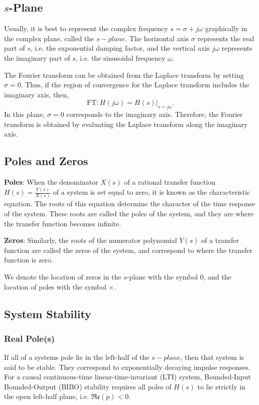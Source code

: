 \documentclass{article}
\begin{document}
\subsection{$s$-Plane}
Usually, it is best to represent the complex frequency $s=\sigma +j\omega $ graphically in the complex plane, called the $s-plane$. The horizontal axis $\sigma $ represents the real part of $s$, i.e. the exponential damping factor, and the vertical axis $j\omega $ represents the imaginary part of $s$, i.e. the sinusoidal frequency $\omega $.

The Fourier transform can be obtained from the Laplace transform by setting $\sigma =0$. Thus, if the region of convergence for the Laplace transform includes the imaginary axis, then,
\[
    \text{FT}: H(j\omega )=H(s)\rvert_{s=j\omega }.
\]In this plane, $\sigma =0$ corresponds to the imaginary axis. Therefore, the Fourier transform is obtained by evaluating the Laplace transform along the imaginary axis.

\subsection{Poles and Zeros}
\textbf{Poles}: When the denominator $X(s)$ of a rational transfer function $H(s)=\frac{Y(s)}{X(s)}$ of a system is set equal to zero, it is known as the characteristic equation. The roots of this equation determine the character of the time response of the system. These roots are called the poles of the system, and they are where the transfer function becomes infinite.

\noindent\textbf{Zeros}: Similarly, the roots of the numerator polynomial $Y(s)$ of a transfer function are called the zeros of the system, and correspond to where the transfer function is zero.

We denote the location of zeros in the $s$-plane with the symbol $0$, and the location of poles with the symbol $\times$.

\subsection{System Stability}
\subsubsection{Real Pole(s)}
If all of a systems pole lie in the left-half of the $s-plane$, then that system is said to be stable. They correspond to exponentially decaying impulse responses. For a causal continuous-time linear-time-invariant (LTI) system, Bounded-Input Bounded-Output (BIBO) stability requires all poles of $H(s)$ to lie strictly in the open left-half plane, i.e. $\mathfrak{Re}(p)<0$.
\end{document}
